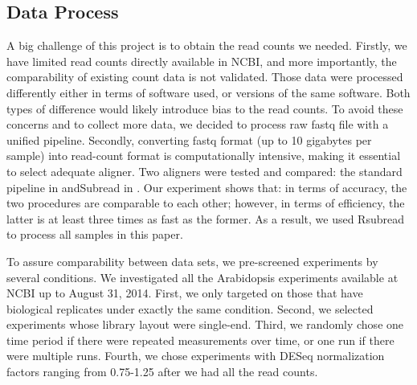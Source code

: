 \documentclass[11pt, a4paper]{article}
\begin{document}
  
  
  \subsection{Data Process}
  A big challenge of this project is to obtain the read counts we needed. Firstly, we have limited read counts directly available in NCBI, and more importantly,  the comparability of existing count data is not validated. Those data were processed differently either in terms of software used, or versions of the same software. Both types of difference would likely introduce bias to the read counts. To avoid these concerns and to collect more data, we decided to process raw fastq file with a unified pipeline. Secondly, converting fastq format (up to 10 gigabytes per sample)  into read-count format is computationally intensive, making it essential to select adequate aligner. Two aligners were tested and compared: the standard pipeline in \cite{anders2013count} andSubread in \cite{liao2013subread}.  Our experiment shows that:  in terms of accuracy, the two procedures are comparable to each other; however, in terms of efficiency, the latter is at least three times as fast as the former. As a result, we used Rsubread to process all samples in this paper.

To assure comparability between data sets, we pre-screened experiments by several conditions. We investigated all the Arabidopsis experiments available at NCBI up to August 31, 2014. First, we only targeted on those that have biological replicates under exactly the same condition. Second, we selected experiments whose library layout were single-end. Third, we randomly chose one time period if there were repeated measurements over time, or one run if there were multiple runs. Fourth, we chose experiments with DESeq normalization factors ranging from 0.75-1.25 after we had all the read counts. 
\end{document}
